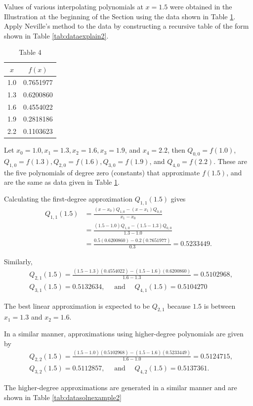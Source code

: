 \begin{example}\label{example3nevile}
Values of various interpolating polynomials at $x=1.5$ were obtained in the Illustration at the beginning of the Section using the data shown in Table \ref{tab:dataexample2}. Apply Neville's method to the data by constructing a recursive table of the form shown in Table \ref{tab:dataexplain2}.
\end{example}

\begin{table}
\centering
\begin{tabular}{cc}
\hline
$x$ & $f(x)$ \\
\hline
1.0 & 0.7651977 \\
1.3 & 0.6200860 \\
1.6 & 0.4554022 \\
1.9 & 0.2818186 \\
2.2 & 0.1103623 \\
\hline
\end{tabular}
\caption{\scriptsize Table 4}
\label{tab:dataexample2}
\end{table}

\begin{mysolution}
Let $x_{0}=1.0, x_{1}=1.3, x_{2}=1.6, x_{3}=1.9$, and $x_{4}=2.2$, then $Q_{0,0}=f(1.0)$, $Q_{1,0}=f(1.3), Q_{2,0}=f(1.6), Q_{3,0}=f(1.9)$, and $Q_{4,0}=f(2.2)$. These are the five polynomials of degree zero (constants) that approximate $f(1.5)$, and are the same as data given in Table \ref{tab:dataexample2}.

Calculating the first-degree approximation $Q_{1,1}(1.5)$ gives
\[\begin{aligned}
Q_{1,1}(1.5) & =\frac{\left(x-x_{0}\right) Q_{1,0}-\left(x-x_{1}\right) Q_{0,0}}{x_{1}-x_{0}} \\
& =\frac{(1.5-1.0) Q_{1,0}-(1.5-1.3) Q_{0,0}}{1.3-1.0} \\
& =\frac{0.5(0.6200860)-0.2(0.7651977)}{0.3}=0.5233449 .
\end{aligned}\]

Similarly,
\[\begin{aligned}
& Q_{2,1}(1.5)=\frac{(1.5-1.3)(0.4554022)-(1.5-1.6)(0.6200860)}{1.6-1.3}=0.5102968, \\
& Q_{3,1}(1.5)=0.5132634, \quad \text { and } \quad Q_{4,1}(1.5)=0.5104270
\end{aligned}\]

The best linear approximation is expected to be $Q_{2,1}$ because $1.5$ is between $x_{1}=1.3$ and $x_{2}=1.6$.

In a similar manner, approximations using higher-degree polynomials are given by
\[\begin{aligned}
& Q_{2,2}(1.5)=\frac{(1.5-1.0)(0.5102968)-(1.5-1.6)(0.5233449)}{1.6-1.0}=0.5124715, \\
& Q_{3,2}(1.5)=0.5112857, \quad \text { and } \quad Q_{4,2}(1.5)=0.5137361 .
\end{aligned}\]

The higher-degree approximations are generated in a similar manner and are shown in Table \ref{tab:datasolnexample2}
\end{mysolution}

